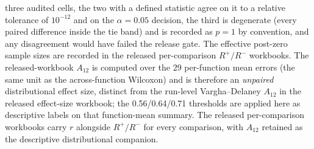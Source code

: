 \documentclass[10pt,a4paper]{article}
\begin{document}
three audited cells, the two with a defined statistic agree on it to a
relative tolerance of $10^{-12}$ and on the $\alpha = 0.05$ decision, the
third is degenerate (every paired difference inside the tie band) and is
recorded as $p = 1$ by convention, and any disagreement would have failed
the release gate.
The effective post-zero sample sizes are recorded in the released
per-comparison $R^{+}/R^{-}$ workbooks. The released-workbook $A_{12}$ is
computed over the 29 per-function mean errors (the same unit as the
across-function Wilcoxon) and is therefore an \emph{unpaired}
distributional effect size, distinct from the run-level Vargha--Delaney
$A_{12}$ in the released effect-size workbook; the 0.56/0.64/0.71
thresholds are applied here as descriptive labels on that function-mean
summary. The released per-comparison workbooks carry $r$ alongside
$R^{+}/R^{-}$ for every comparison, with $A_{12}$ retained as the descriptive
distributional companion.
\end{document}
